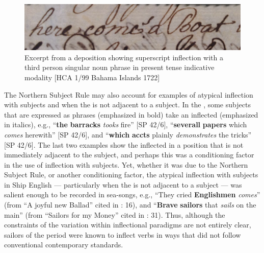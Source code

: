  
\begin{figure} 
\includegraphics[width=\textwidth]{figures/delgado-img16.png}

\caption{\label{fig:key:6.2} Excerpt from a deposition showing superscript inflection with a third person singular noun phrase in present tense indicative modality [HCA 1/99 Bahama {Islands 1722}]}
\end{figure}


The Northern Subject Rule may also account for examples of atypical inflection with   subjects and when the  is not adjacent to a subject. In the , some   subjects that are expressed as  phrases (emphasized in bold) take an inflected  (emphasized in italics), e.g., “\textbf{the} \textbf{barracks} \textit{tooks} fire” [SP 42/6], “\textbf{severall} \textbf{papers} which \textit{comes} herewith” [SP 42/6], and “\textbf{which} \textbf{accts} plainly \textit{demonstrates} the tricks” [SP 42/6]. The last two examples show the inflected  in a position that is not immediately adjacent to the  subject, and perhaps this was a conditioning factor in the use of inflection with  subjects. Yet, whether it was due to the Northern Subject Rule, or another conditioning factor, the atypical inflection with   subjects in Ship English — particularly when the  is not adjacent to a subject — was salient enough to be recorded in  sea-songs, e.g., “They cried \textbf{Englishmen} \textit{comes}” (from “A joyful new Ballad” cited in \citealt{Palmer1986}: 16), and “\textbf{Brave} \textbf{sailors} that \textit{sails} on the main” (from “Sailors for my Money” cited in \citealt{Palmer1986}: 31). Thus, although the constraints of the variation within inflectional paradigms are not entirely clear, sailors of the period were known to inflect verbs in ways that did not follow conventional contemporary standards. 

